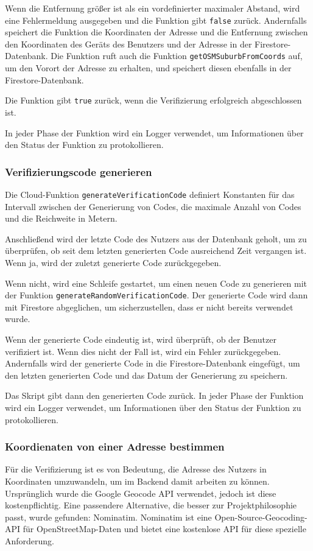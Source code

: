 Wenn die Entfernung größer ist als ein vordefinierter maximaler Abstand, wird eine Fehlermeldung ausgegeben und die Funktion gibt \texttt{false} zurück. Andernfalls speichert die Funktion die Koordinaten der Adresse und die Entfernung zwischen den Koordinaten des Geräts des Benutzers und der Adresse in der Firestore-Datenbank. Die Funktion ruft auch die Funktion \texttt{getOSMSuburbFromCoords} auf, um den Vorort der Adresse zu erhalten, und speichert diesen ebenfalls in der Firestore-Datenbank.

Die Funktion gibt \texttt{true} zurück, wenn die Verifizierung erfolgreich abgeschlossen ist.

In jeder Phase der Funktion wird ein Logger verwendet, um Informationen über den Status der Funktion zu protokollieren.

\subsubsection{Verifizierungscode generieren}
Die Cloud-Funktion \texttt{generateVerificationCode} definiert Konstanten für das Intervall zwischen der Generierung von Codes, die maximale Anzahl von Codes und die Reichweite in Metern.

Anschließend wird der letzte Code des Nutzers aus der Datenbank geholt, um zu überprüfen, ob seit dem letzten generierten Code ausreichend Zeit vergangen ist. Wenn ja, wird der zuletzt generierte Code zurückgegeben.

Wenn nicht, wird eine Schleife gestartet, um einen neuen Code zu generieren mit der Funktion \texttt{generateRandomVerificationCode}. Der generierte Code wird dann mit Firestore abgeglichen, um sicherzustellen, dass er nicht bereits verwendet wurde.

Wenn der generierte Code eindeutig ist, wird überprüft, ob der Benutzer verifiziert ist. Wenn dies nicht der Fall ist, wird ein Fehler zurückgegeben. Andernfalls wird der generierte Code in die Firestore-Datenbank eingefügt, um den letzten generierten Code und das Datum der Generierung zu speichern.

Das Skript gibt dann den generierten Code zurück. In jeder Phase der Funktion wird ein Logger verwendet, um Informationen über den Status der Funktion zu protokollieren.

\subsubsection{Koordienaten von einer Adresse bestimmen}
Für die Verifizierung ist es von Bedeutung, die Adresse des Nutzers in Koordinaten umzuwandeln, um im Backend damit arbeiten zu können. Ursprünglich wurde die Google Geocode API verwendet, jedoch ist diese kostenpflichtig. Eine passendere Alternative, die besser zur Projektphilosophie passt, wurde gefunden: Nominatim. Nominatim ist eine Open-Source-Geocoding-API für OpenStreetMap-Daten und bietet eine kostenlose API für diese spezielle Anforderung.

